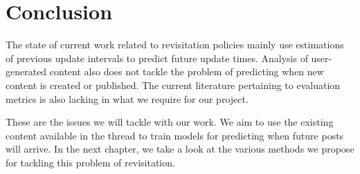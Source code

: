 \section{Conclusion}
The state of current work related to revisitation policies mainly use 
estimations of previous update intervals to predict future update times.  
Analysis of user-generated content also does not tackle the problem of 
predicting when new content is created or published. The current literature
pertaining to evaluation metrics is also lacking in what we require for our 
project.

These are the issues we will tackle with our work. We aim to use the existing content available in the thread to train models for 
predicting when future posts will arrive. In the next chapter, we take a look at 
the various methods we propose for tackling this problem of revisitation.
